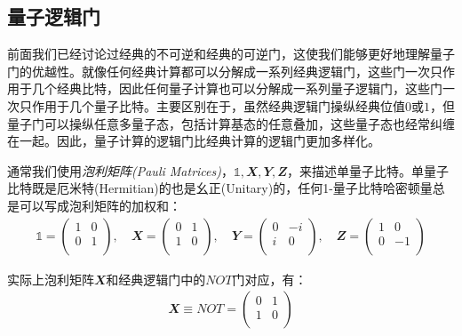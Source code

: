 \subsection[量子逻辑门]{量子逻辑门}
前面我们已经讨论过经典的不可逆和经典的可逆门，这使我们能够更好地理解量子门的优越性。就像任何经典计算都可以分解成一系列经典逻辑门，这些门一次只作用于几个经典比特，因此任何量子计算也可以分解成一系列量子逻辑门，这些门一次只作用于几个量子比特。主要区别在于，虽然经典逻辑门操纵经典位值$0$或$1$，但量子门可以操纵任意多量子态，包括计算基态的任意叠加，这些量子态也经常纠缠在一起。因此，量子计算的逻辑门比经典计算的逻辑门更加多样化。

通常我们使用\emph{泡利矩阵(Pauli Matrices)}，$\mathbb{1}, \mathbfit{X}, \mathbfit{Y}, \mathbfit{Z}$，来描述单量子比特。单量子比特既是厄米特(Hermitian)的也是幺正(Unitary)的，任何1-量子比特哈密顿量总是可以写成泡利矩阵的加权和：
\begin{align}
    \mathbb{1}=\begin{pmatrix}
        1 & 0 \\
        0 & 1 \\
    \end{pmatrix}, \quad \mathbfit{X}=\begin{pmatrix}
        0 & 1 \\
        1 & 0 \\
    \end{pmatrix}, \quad  \mathbfit{Y}=\begin{pmatrix}
        0 & -i \\
        i & 0 \\
    \end{pmatrix}, \quad  \mathbfit{Z}=\begin{pmatrix}
        1 & 0 \\
        0 & -1 \\
    \end{pmatrix} \label{eq:pauli_matrices}
\end{align}

实际上泡利矩阵$\mathbfit{X}$和经典逻辑门中的$NOT$门对应，有：
\begin{align}
    \mathbfit{X}\equiv NOT = \begin{pmatrix}
        0 & 1 \\
        1 & 0 \\
    \end{pmatrix}
\end{align}

